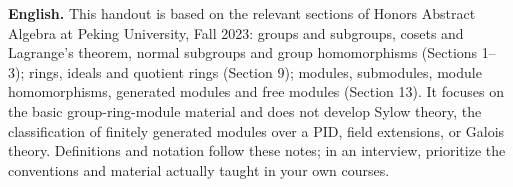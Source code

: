\documentclass[UTF8,11pt,a4paper]{ctexart}
\newcommand{\EN}[1]{\par\noindent\textbf{English.} #1\par}
\begin{document}
\EN{This handout is based on the relevant sections of Honors Abstract Algebra at Peking University, Fall 2023: groups and subgroups, cosets and Lagrange's theorem, normal subgroups and group homomorphisms (Sections 1--3); rings, ideals and quotient rings (Section 9); modules, submodules, module homomorphisms, generated modules and free modules (Section 13). It focuses on the basic group-ring-module material and does not develop Sylow theory, the classification of finitely generated modules over a PID, field extensions, or Galois theory. Definitions and notation follow these notes; in an interview, prioritize the conventions and material actually taught in your own courses.}
\end{document}
